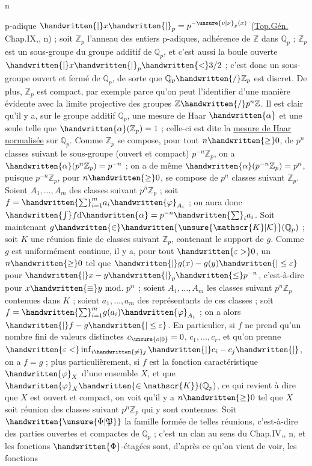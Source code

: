 n

p-adique $\handwritten{|}x\handwritten{|}_{p}=p^{-\unsure{v|\nu}_{p}(x)}$ (\uline{Top.Gén.} Chap.IX,, n) ; soit $\mathbb{Z}_{p}$ l'anneau des entiers p-adiques, adhérence de $\mathbb{Z}$ dans $\mathbb{Q}_{p}$ ; $\mathbb{Z}_{p}$ est un sous-groupe du groupe additif de $\mathbb{Q}_{p}$, et c'est aussi la boule ouverte $\handwritten{|}x\handwritten{|}_{p}\handwritten{<}3/2$ ; c'est donc un sous-groupe ouvert et fermé de $\mathbb{Q}_{p}$, de sorte que $\mathbb{Q}_{p}\handwritten{/}\mathbb{Z}_{p}$ est discret. De plus, $\mathbb{Z}_{p}$ est compact, par exemple parce qu'on peut l'identifier d'une manière évidente avec la limite projective des groupes $\mathbb{Z}\handwritten{/}p^{n}\mathbb{Z}$. Il est clair qu'il y a, sur le groupe additif $\mathbb{Q}_{p}$, une mesure de Haar $\handwritten{\alpha}$ et une seule telle que $\handwritten{\alpha}(\mathbb{Z}_{p})=1$ ; celle-ci est dite la \uline{mesure de Haar normalisée} sur $\mathbb{Q}_{p}$. Comme $\mathbb{Z}_{p}$ se compose, pour tout $n\handwritten{\geq}0$, de $p^{n}$ classes suivant le sous-groupe (ouvert et compact) $p^{-n}\mathbb{Z}_{p}$, on a $\handwritten{\alpha}(p^{n}\mathbb{Z}_{p})=p^{-n}$ ; on a de même $\handwritten{\alpha}(p^{-n}\mathbb{Z}_{p})=p^{n}$, puisque $p^{-n}\mathbb{Z}_{p}$, pour $n\handwritten{\geq}0$, se compose de $p^{n}$ classes suivant $\mathbb{Z}_{p}$. Soient $A_{1},\ldots,A_{m}$ des classes suivant $p^{n}\mathbb{Z}_{p}$ ; soit $f=\handwritten{\sum}_{i=1}^{m}a_{i}\handwritten{\varphi}_{A_{i}}$ ; on aura donc $\handwritten{\int}f\mathrm{d}\handwritten{\alpha}=p^{-n}\handwritten{\sum}_{i}a_{i}$. Soit maintenant $g\handwritten{\in}\handwritten{\unsure{\mathscr{K}|\mathcal{K}}}(\mathbb{Q}_{p})$ ; soit $K$ une réunion finie de classes suivant $\mathbb{Z}_{p}$, contenant le support de $g$. Comme $g$ est uniformément continue, il y a, pour tout $\handwritten{\varepsilon> }0$, un $n\handwritten{\geq}0$ tel que $\handwritten{|}g(x)-g(y)\handwritten{|\leq\varepsilon}$ pour $\handwritten{|}x-y\handwritten{|}_{p}\handwritten{\leq}p^{-n}$, c'est-à-dire pour $x\handwritten{\equiv}y\ \mathrm{mod.}\ p^{n}$ ; soient $A_{1},\ldots,A_{m}$ les classes suivant $p^{n}\mathbb{Z}_{p}$ contenues dans $K$ ; soient $a_{1},\ldots,a_{m}$ des représentants de ces classes ; soit $f=\handwritten{\sum}_{i=1}^{m}g(a_{i})\handwritten{\varphi}_{A_{i}}$ ; on a alors $\handwritten{|}f-g\handwritten{|\leq\varepsilon}$. En particulier, si $f$ ne prend qu'un nombre fini de valeurs distinctes $c_{\unsure{o|0}}=0$, $c_{1},\ldots,c_{r}$, et qu'on prenne $\handwritten{\varepsilon<}\inf_{i\handwritten{\ne}j}\handwritten{|}c_{i}-c_{j}\handwritten{|}$, on a $f=g$ ; plus particulièrement, si $f$ est la fonction caractéristique $\handwritten{\varphi}_{X}$ d'une ensemble $X$, et que $\handwritten{\varphi}_{X}\handwritten{\in\mathscr{K}}(\mathbb{Q}_{p})$, ce qui revient à dire que $X$ est ouvert et compact, on voit qu'il y a $n\handwritten{\geq}0$ tel que $X$ soit réunion des classes suivant $p^{n}\mathbb{Z}_{p}$ qui y sont contenues. Soit $\handwritten{\unsure{\Phi|\mathfrak{P}}}$ la famille formée de telles réunions, c'est-à-dire des parties ouvertes et compactes de $\mathbb{Q}_{p}$ ; c'est un clan au sens du Chap.IV,, n, et les fonctions $\handwritten{\Phi}$-étagées sont, d'après ce qu'on vient de voir, les fonctions
